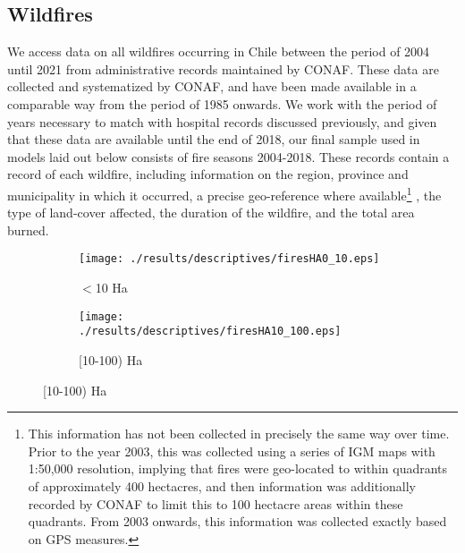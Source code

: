 \documentclass[11pt]{article}
\begin{document}
\begin{spacing}{1.5}
\subsection{Wildfires}
\label{sscn:fires} 
We access data on all wildfires occurring in Chile between the period of 2004 until 2021 from administrative records maintained by CONAF.  These data are collected and systematized by CONAF, and have been made available in a comparable way from the period of 1985 onwards. We work with the period of years necessary to match with hospital records discussed previously, and given that these data are available until the end of 2018, our final sample used in models laid out below consists of fire seasons 2004-2018.  These records contain a record of each wildfire, including information on the region, province and municipality in which it occurred, a precise geo-reference where available\footnote{This information has not been collected in precisely the same way over time.  Prior to the year 2003, this was collected using a series of IGM maps with 1:50,000 resolution, implying that fires were geo-located to within quadrants of approximately 400 hectacres, and then information was additionally recorded by CONAF to limit this to 100 hectacre areas within these quadrants.  From 2003 onwards, this information was collected exactly based on GPS measures.}%
, the type of land-cover affected, the duration of the wildfire, and the total area burned.  


\begin{figure}[htpb!]
    \centering
    \caption{Wildfire Exposures by Magnitude of Fire}
    \label{fig:descfires}
    \begin{subfigure}{0.49\textwidth}
          \texttt{[image: ./results/descriptives/firesHA0\_10.eps]}
         \caption{$<$10 Ha}
    \end{subfigure}
    \begin{subfigure}{0.49\textwidth}
          \texttt{[image: ./results/descriptives/firesHA10\_100.eps]}
         \caption{[10-100) Ha}
    \end{subfigure}


\end{figure}
\end{spacing}
\end{document}
